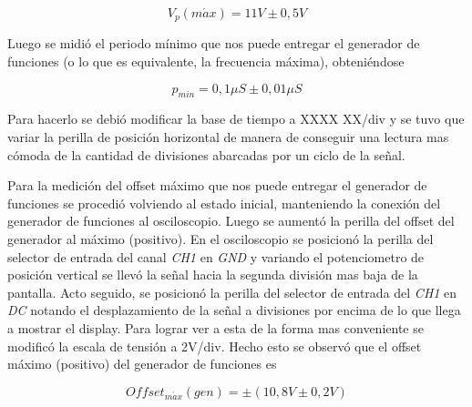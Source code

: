 \documentclass{article}
\begin{document}
\begin{equation*}
	V_p(m\acute{a}x) = 11V \pm 0,5V
\end{equation*}
\medskip
	
	Luego se midió el periodo mínimo que nos puede entregar el generador de funciones (o lo que es equivalente, la frecuencia máxima), obteniéndose

\begin{equation*}
	p_{min} = 0,1\mu S \pm 0,01\mu S
\end{equation*}
\medskip

\noindent Para hacerlo se debió modificar la base de tiempo a XXXX XX/div y se tuvo que variar la perilla de posición horizontal de manera de conseguir una lectura mas cómoda de la cantidad de divisiones abarcadas por un ciclo de la señal.
	\par
	Para la medición del offset máximo que nos puede entregar el generador de funciones se procedió volviendo al estado inicial, manteniendo la conexión del generador de funciones al osciloscopio. Luego se aumentó la perilla del offset del generador al máximo (positivo). En el osciloscopio se posicionó la perilla del selector de entrada del canal \textit{CH1} en \textit{GND} y variando el potenciometro de posición vertical se llevó la señal hacia la segunda división mas baja de la pantalla. Acto seguido, se posicionó la perilla del selector de entrada del \textit{CH1} en \textit{DC} notando el desplazamiento de la señal a divisiones por encima de lo que llega a mostrar el display. Para lograr ver a esta de la forma mas conveniente se modificó la escala de tensión a 2V/div. Hecho esto se observó que el offset máximo (positivo) del generador de funciones es

\begin{equation*}
	Offset_{m\acute{a}x}(gen) = \pm (10,8V \pm 0,2V)
\end{equation*}
\medskip
\end{document}
